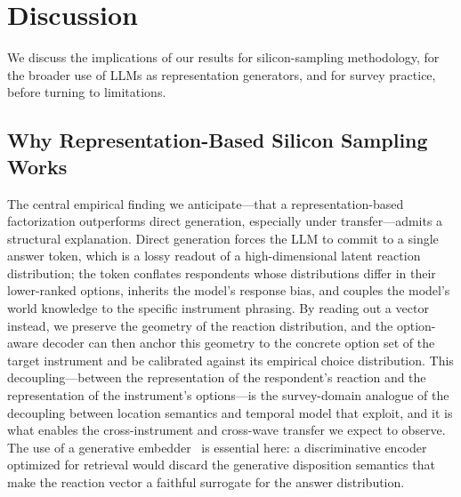 \section{Discussion}
\label{sec:discussion}

We discuss the implications of our results for silicon-sampling methodology, for the broader use of LLMs as representation generators, and for survey practice, before turning to limitations.

\subsection{Why Representation-Based Silicon Sampling Works}
The central empirical finding we anticipate---that a representation-based factorization outperforms direct generation, especially under transfer---admits a structural explanation. Direct generation forces the LLM to commit to a single answer token, which is a lossy readout of a high-dimensional latent reaction distribution; the token conflates respondents whose distributions differ in their lower-ranked options, inherits the model's response bias, and couples the model's world knowledge to the specific instrument phrasing. By reading out a vector instead, we preserve the geometry of the reaction distribution, and the option-aware decoder can then anchor this geometry to the concrete option set of the target instrument and be calibrated against its empirical choice distribution. This decoupling---between the representation of the respondent's reaction and the representation of the instrument's options---is the survey-domain analogue of the decoupling between location semantics and temporal model that \citet{he2025geolocation} exploit, and it is what enables the cross-instrument and cross-wave transfer we expect to observe. The use of a generative embedder~\citep{behnamghader2026llmvecgen} is essential here: a discriminative encoder optimized for retrieval would discard the generative disposition semantics that make the reaction vector a faithful surrogate for the answer distribution.

